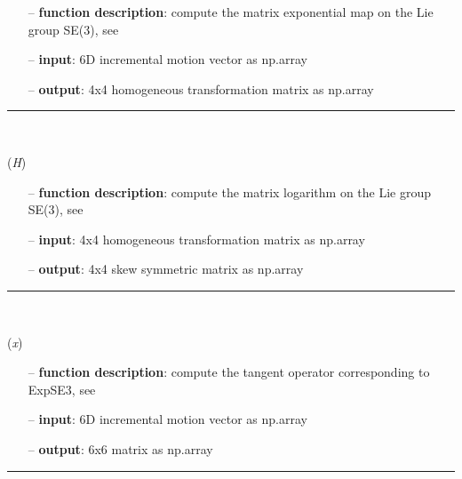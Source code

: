\begin{itemize}[leftmargin=1.4cm]
\begin{itemize}[leftmargin=0.5cm]
\begin{itemize}[leftmargin=1.4cm]
\begin{itemize}[leftmargin=0.5cm]
\begin{itemize}[leftmargin=1.4cm]
\begin{itemize}[leftmargin=0.5cm]
\begin{itemize}[leftmargin=1.4cm]
\begin{itemize}[leftmargin=1.4cm]
\begin{itemize}[leftmargin=1.4cm]
\begin{itemize}[leftmargin=1.4cm]
\begin{itemize}[leftmargin=0.5cm]
\begin{itemize}[leftmargin=0.7cm]
  \item[--]  {\bf function description}: compute the matrix exponential map on the Lie group SE(3), see \cite{Bruels2011}  \item[--]  {\bf input}: 6D incremental motion vector as np.array  \item[--]  {\bf output}: 4x4 homogeneous transformation matrix as np.array\vspace{12pt}\end{itemize}
%
\noindent\rule{8cm}{0.75pt}\vspace{1pt} \\ 
\begin{flushleft}
\label{sec:lieGroupBasics:LogSE3}
({\it H})
\end{flushleft}
\setlength{\itemindent}{0.7cm}
\begin{itemize}[leftmargin=0.7cm]
  \item[--]  {\bf function description}: compute the matrix logarithm on the Lie group SE(3), see \cite{Sonneville2014}  \item[--]  {\bf input}: 4x4 homogeneous transformation matrix as np.array  \item[--]  {\bf output}: 4x4 skew symmetric matrix as np.array\vspace{12pt}\end{itemize}
%
\noindent\rule{8cm}{0.75pt}\vspace{1pt} \\ 
\begin{flushleft}
\label{sec:lieGroupBasics:TExpSE3}
({\it x})
\end{flushleft}
\setlength{\itemindent}{0.7cm}
\begin{itemize}[leftmargin=0.7cm]
  \item[--]  {\bf function description}: compute the tangent operator corresponding to ExpSE3, see \cite{Bruels2011}  \item[--]  {\bf input}: 6D incremental motion vector as np.array  \item[--]  {\bf output}: 6x6 matrix as np.array\vspace{12pt}\end{itemize}
%
\noindent\rule{8cm}{0.75pt}\vspace{1pt} \\ 

\end{itemize}
\end{itemize}
\end{itemize}
\end{itemize}
\end{itemize}
\end{itemize}
\end{itemize}
\end{itemize}
\end{itemize}
\end{itemize}
\end{itemize}
